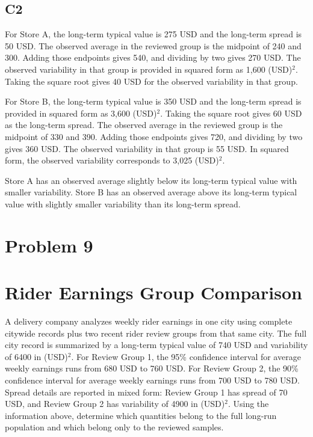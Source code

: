 \begin{ExamProblems}
\subsection*{C2}
		For Store A, the long-term typical value is 275 USD and the long-term spread is 50 USD.
		The observed average in the reviewed group is the midpoint of 240 and 300.
		Adding those endpoints gives 540, and dividing by two gives 270 USD.
		The observed variability in that group is provided in squared form as 1,600 (USD)$^2$.
		Taking the square root gives 40 USD for the observed variability in that group.

		For Store B, the long-term typical value is 350 USD and the long-term spread is provided in squared form as 3,600 (USD)$^2$.
		Taking the square root gives 60 USD as the long-term spread.
		The observed average in the reviewed group is the midpoint of 330 and 390.
		Adding those endpoints gives 720, and dividing by two gives 360 USD.
		The observed variability in that group is 55 USD.
		In squared form, the observed variability corresponds to 3,025 (USD)$^2$.

		Store A has an observed average slightly below its long-term typical value with smaller variability.
		Store B has an observed average above its long-term typical value with slightly smaller variability than its long-term spread.


		\newpage
		\item
		\section{Problem 9}
		\section{Rider Earnings Group Comparison}
		A delivery company analyzes weekly rider earnings in one city using complete citywide records plus two recent rider review groups from that same city.
		The full city record is summarized by a long-term typical value of 740 USD and variability of 6400 in (USD)$^2$.
		For Review Group 1, the 95\% confidence interval for average weekly earnings runs from 680 USD to 760 USD.
		For Review Group 2, the 90\% confidence interval for average weekly earnings runs from 700 USD to 780 USD.
		Spread details are reported in mixed form: Review Group 1 has spread of 70 USD, and Review Group 2 has variability of 4900 in (USD)$^2$.
		Using the information above, determine which quantities belong to the full long-run population and which belong only to the reviewed samples.


\end{ExamProblems}
